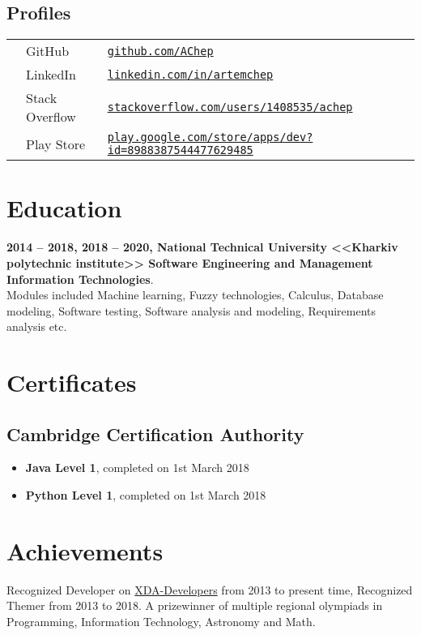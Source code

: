 \documentclass[a4paper]{article}
\begin{document}
	\subsection*{Profiles}
	\begin{tabular}{@{}lll}
		\faGithub & GitHub & \href{https://github.com/AChep}{\texttt{github.com/AChep}} \\
		\faLinkedin & LinkedIn & \href{https://www.linkedin.com/in/artemchep/}{\texttt{linkedin.com/in/artemchep}} \\
		\faStackOverflow & Stack Overflow & \href{https://stackoverflow.com/users/1408535/achep}{\texttt{stackoverflow.com/users/1408535/achep}} \\
		\faPlay & Play Store & \href{https://play.google.com/store/apps/dev?id=8988387544477629485}{\texttt{play.google.com/store/apps/dev?id=8988387544477629485}} \\
	\end{tabular}

	\section*{Education}
	\textbf{2014 -- 2018, 2018 -- 2020, National Technical University <<Kharkiv polytechnic institute>> Software Engineering and Management Information Technologies}. \\
	Modules included Machine learning, Fuzzy technologies, Calculus, Database modeling, Software testing, Software analysis and modeling, Requirements analysis etc.
	
	\section*{Certificates}
	\subsection*{Cambridge Certification Authority}
	\begin{itemize}
		\item \textbf{Java Level 1}, completed on 1st March 2018
		\item \textbf{Python Level 1}, completed on 1st March 2018
	\end{itemize}

	\section*{Achievements}
	Recognized Developer on \href{https://forum.xda-developers.com/member.php?u=3685328}{XDA-Developers} from 2013 to present time, Recognized Themer from 2013 to 2018.
	A prizewinner of multiple regional olympiads in Programming, Information Technology, Astronomy and Math.
\end{document}
